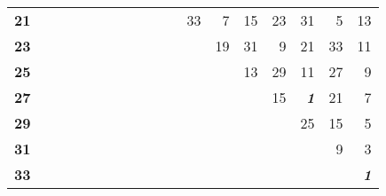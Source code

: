 \begin{tabular}{rllllllllrrrrrrrrr}
\textbf{21} &  &  &  &  &  &  &  &  & \multicolumn{1}{l}{} & \multicolumn{1}{l}{} & 33 & 7 & 15 & 23 & 31 & 5 & 13 \\ 
\textbf{23} &  &  &  &  &  &  &  &  & \multicolumn{1}{l}{} & \multicolumn{1}{l}{} & \multicolumn{1}{l}{} & 19 & 31 & 9 & 21 & 33 & 11 \\ 
\textbf{25} &  &  &  &  &  &  &  &  & \multicolumn{1}{l}{} & \multicolumn{1}{l}{} & \multicolumn{1}{l}{} & \multicolumn{1}{l}{} & 13 & 29 & 11 & 27 & 9 \\ 
\textbf{27} &  &  &  &  &  &  &  &  & \multicolumn{1}{l}{} & \multicolumn{1}{l}{} & \multicolumn{1}{l}{} & \multicolumn{1}{l}{} & \multicolumn{1}{l}{} & 15 & \textbf{\textit{1}} & 21 & 7 \\ 
\textbf{29} &  &  &  &  &  &  &  &  & \multicolumn{1}{l}{} & \multicolumn{1}{l}{} & \multicolumn{1}{l}{} & \multicolumn{1}{l}{} & \multicolumn{1}{l}{} & \multicolumn{1}{l}{} & 25 & 15 & 5 \\ 
\textbf{31} &  &  &  &  &  &  &  &  & \multicolumn{1}{l}{} & \multicolumn{1}{l}{} & \multicolumn{1}{l}{} & \multicolumn{1}{l}{} & \multicolumn{1}{l}{} & \multicolumn{1}{l}{} & \multicolumn{1}{l}{} & 9 & 3 \\ 
\textbf{33} &  &  &  &  &  &  &  &  & \multicolumn{1}{l}{} & \multicolumn{1}{l}{} & \multicolumn{1}{l}{} & \multicolumn{1}{l}{} & \multicolumn{1}{l}{} & \multicolumn{1}{l}{} & \multicolumn{1}{l}{} & \multicolumn{1}{l}{} & \textbf{\textit{1}} \\ 
\end{tabular}
